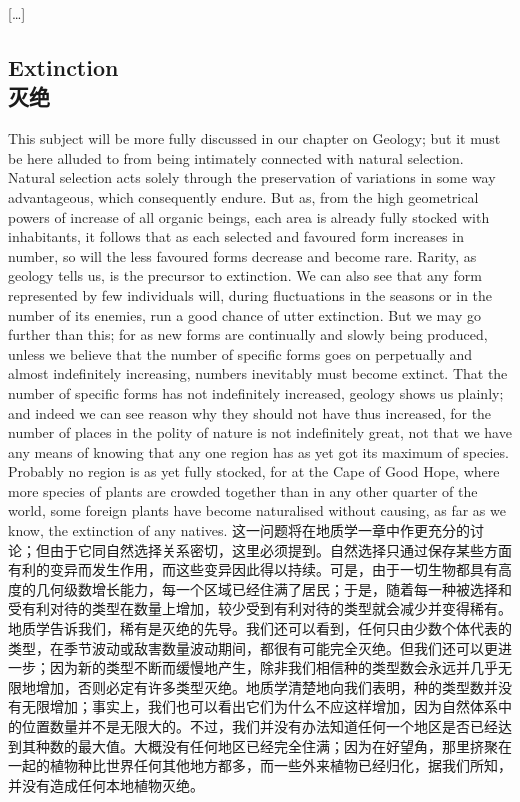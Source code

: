 \begin{center}
[\ldots]
\end{center}

\subsection*{Extinction\\灭绝}

\darwinpair
{This subject will be more fully discussed in our chapter on Geology; but it must be here alluded to from being intimately connected with natural selection. Natural selection acts solely through the preservation of variations in some way advantageous, which consequently endure. But as, from the high geometrical powers of increase of all organic beings, each area is already fully stocked with inhabitants, it follows that as each selected and favoured form increases in number, so will the less favoured forms decrease and become rare. Rarity, as geology tells us, is the precursor to extinction. We can also see that any form represented by few individuals will, during fluctuations in the seasons or in the number of its enemies, run a good chance of utter extinction. But we may go further than this; for as new forms are continually and slowly being produced, unless we believe that the number of specific forms goes on perpetually and almost indefinitely increasing, numbers inevitably must become extinct. That the number of specific forms has not indefinitely increased, geology shows us plainly; and indeed we can see reason why they should not have thus increased, for the number of places in the polity of nature is not indefinitely great, not that we have any means of knowing that any one region has as yet got its maximum of species. Probably no region is as yet fully stocked, for at the Cape of Good Hope, where more species of plants are crowded together than in any other quarter of the world, some foreign plants have become naturalised without causing, as far as we know, the extinction of any natives.}
{这一问题将在地质学一章中作更充分的讨论；但由于它同自然选择关系密切，这里必须提到。自然选择只通过保存某些方面有利的变异而发生作用，而这些变异因此得以持续。可是，由于一切生物都具有高度的几何级数增长能力，每一个区域已经住满了居民；于是，随着每一种被选择和受有利对待的类型在数量上增加，较少受到有利对待的类型就会减少并变得稀有。地质学告诉我们，稀有是灭绝的先导。我们还可以看到，任何只由少数个体代表的类型，在季节波动或敌害数量波动期间，都很有可能完全灭绝。但我们还可以更进一步；因为新的类型不断而缓慢地产生，除非我们相信种的类型数会永远并几乎无限地增加，否则必定有许多类型灭绝。地质学清楚地向我们表明，种的类型数并没有无限增加；事实上，我们也可以看出它们为什么不应这样增加，因为自然体系中的位置数量并不是无限大的。不过，我们并没有办法知道任何一个地区是否已经达到其种数的最大值。大概没有任何地区已经完全住满；因为在好望角，那里挤聚在一起的植物种比世界任何其他地方都多，而一些外来植物已经归化，据我们所知，并没有造成任何本地植物灭绝。}

